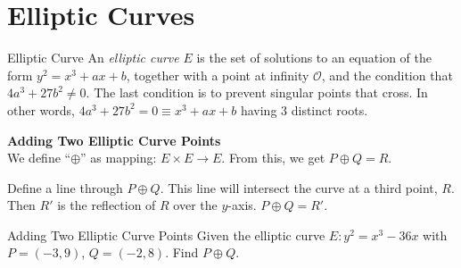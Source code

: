 \section{Elliptic Curves}
\newcommand{\op}{\oplus}
\newcommand{\fanO}{\mathcal{O}}
\begin{definition}
    {Elliptic Curve} An \textit{elliptic curve} \(E\) is the set of solutions to an equation of the form \(y^2 = x^3 + ax + b\), together with a point at infinity \(\mathcal{O}\), and the condition that \(4a^{3} + 27b^{2} \ne 0\). The last condition is to prevent singular points that cross. In other words, \(4a^{3} + 27b^{2} = 0 \equiv x^{3} + ax + b\) having 3 distinct roots.
\end{definition}

\begin{center}
    \textbf{Adding Two Elliptic Curve Points} \\

    We define ``\(\oplus\)'' as mapping: \(E \times E \to E\). From this, we get \(P \oplus Q = R\).
\end{center}

Define a line through \(P \op Q\). This line will intersect the curve at a third point, \(R\). Then \(R'\) is the reflection of \(R\) over the \(y\)-axis. \(P \oplus Q = R'\).

\begin{example}
    {Adding Two Elliptic Curve Points} Given the elliptic curve \(E\colon y^{2} = x^{3} - 36x\) with \(P = (-3,9)\), \(Q = (-2,8)\). Find \(P \oplus Q\).
\end{example}

